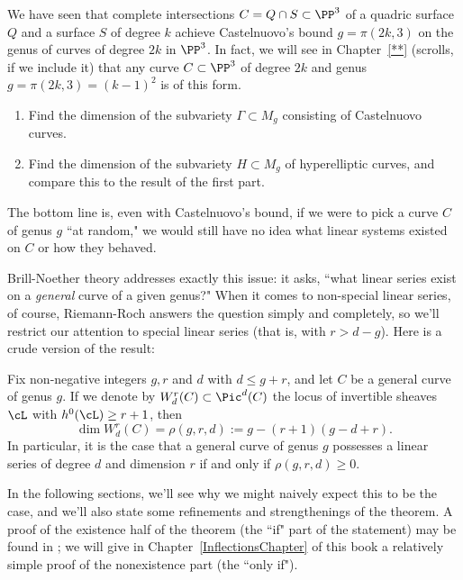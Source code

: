 \begin{exercise}
We have seen that complete intersections $C = Q \cap S \subset \PP^3$ of a quadric surface $Q$ and a surface $S$ of degree $k$ achieve Castelnuovo's bound $g = \pi(2k, 3)$ on the genus of curves of degree $2k$ in $\PP^3$. In fact, we will see in Chapter~\ref{**} (scrolls, if we include it) that any curve $C \subset \PP^3$ of degree $2k$ and genus $g = \pi(2k, 3) = (k-1)^2$ is of this form.
\begin{enumerate}
\item Find the dimension of the subvariety $\Gamma \subset M_g$ consisting of Castelnuovo curves.
\item Find the dimension of the subvariety $H \subset M_g$ of hyperelliptic curves, and compare this to the result of the first part.
\end{enumerate}
\end{exercise}

The bottom line is, even with Castelnuovo's bound, if we were to pick a curve $C$ of genus $g$ ``at random," we would still have no idea what linear systems existed on $C$ or how they behaved.

Brill-Noether theory addresses exactly this issue: it asks, ``what linear series exist on a \emph{general} curve of a given genus?" When it comes to non-special linear series, of course, Riemann-Roch answers the question simply and completely, so we'll restrict our attention to special linear series (that is, with $r > d - g$). 
Here is a crude version of the result:

\begin{theorem}\label{basic BN}
Fix non-negative integers $g, r$ and $d$ with $d \leq g+r$, and let $C$ be a general curve of genus $g$. If we denote by $W^r_d(C) \subset \Pic^d(C)$ the locus of invertible sheaves $\cL$ with $h^0(\cL) \geq r+1$, then
$$
\dim W^r_d(C) = \rho(g,r,d) := g - (r+1)(g-d+r).
$$
In particular, it is the case that a general curve of genus $g$ possesses a linear series of degree $d$ and dimension $r$ if and only if $\rho(g,r,d) \geq 0$.
\end{theorem}

In the following sections, we'll see why we might naively expect this to be the case, and we'll also state some refinements and strengthenings of the theorem.  A proof of the existence half of the theorem (the ``if" part of the statement) may be found in \cite[Theorem ****]{3264};  we will give in Chapter~\ref{InflectionsChapter} of this book a relatively simple proof of the nonexistence part (the ``only if"). 

